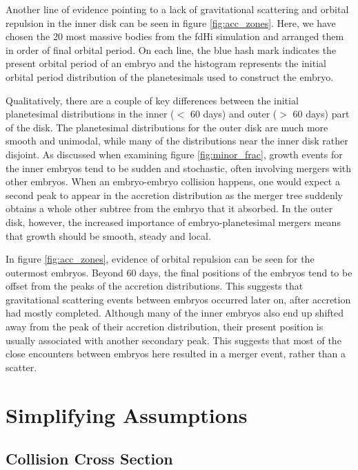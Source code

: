 \documentclass[twocolumn,linenumbers]{aastex63}
\begin{document}
Another line of evidence pointing to a lack of gravitational
scattering and orbital repulsion in the inner disk can be seen in
figure \ref{fig:acc_zones}. Here, we have chosen the 20 most massive
bodies from the fdHi simulation and arranged them in order of final
orbital period. On each line, the blue
hash mark indicates the present orbital period of an embryo and the histogram represents the initial orbital period distribution of the planetesimals used to construct the embryo.

Qualitatively, there are a couple of key differences between the initial planetesimal distributions in the inner ($<$ 60 days) and outer ($>$ 60 days) part of the disk. The planetesimal distributions for the outer disk are much more smooth and unimodal, while many of the distributions near the inner disk rather disjoint. As discussed when examining figure \ref{fig:minor_frac}, growth events for the inner embryos tend to be sudden and stochastic, often involving mergers with other embryos. When an embryo-embryo collision happens, one would expect a second peak to appear in the accretion distribution as the merger tree suddenly obtains a whole other subtree from the embryo that it absorbed. In the outer disk, however, the increased importance of embryo-planetesimal mergers means that growth should be smooth, steady and local.

In figure \ref{fig:acc_zones}, evidence of orbital repulsion can be seen for the outermost embryos. Beyond 60 days, the final positions of the embryos tend to be offset from the peaks of the accretion distributions. This suggests that gravitational scattering events between embryos occurred later on, after accretion had mostly completed. Although many of the inner embryos also end up shifted away from the peak of their accretion distribution, their present position is usually associated with another secondary peak. This suggests that most of the close encounters between embryos here resulted in a merger event, rather than a scatter.

\section{Simplifying Assumptions}\label{sec:assump}

\subsection{Collision Cross Section}
\end{document}
